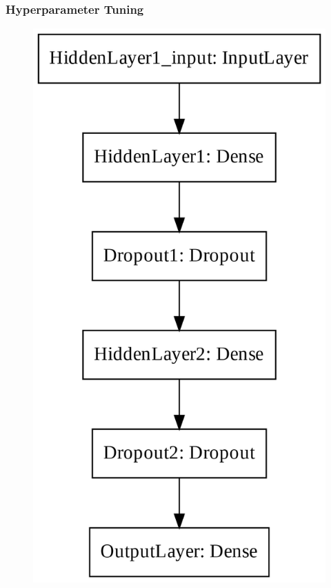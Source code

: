 \subsubsection{Hyperparameter Tuning}
\begin{figure}[!htp]
\centering
\begin{minipage}[b][][b]{.35\linewidth}
    \includegraphics[width=\linewidth]{templates/images/Figure-TF_NN_Structure.png}

\end{minipage}
\end{figure}
